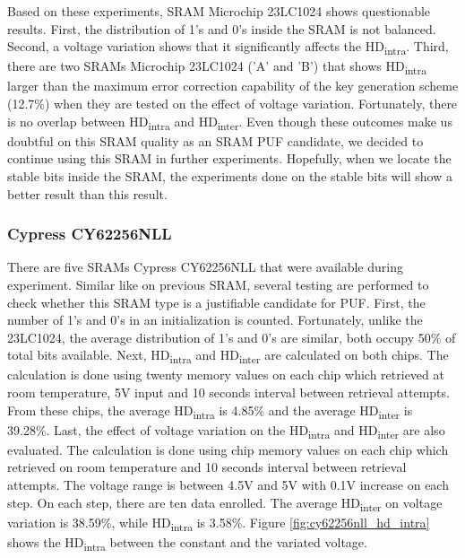 Based on these experiments, SRAM Microchip 23LC1024 shows questionable results. First, the distribution of 1's and 0's inside the SRAM is not balanced. Second, a voltage variation shows that it significantly affects the  HD\textsubscript{intra}. Third, there are two SRAMs Microchip 23LC1024 ('A' and 'B') that shows HD\textsubscript{intra} larger than the maximum error correction capability of the key generation scheme (12.7\%) when they are tested on the effect of voltage variation. Fortunately, there is no overlap between HD\textsubscript{intra} and HD\textsubscript{inter}. Even though these outcomes make us doubtful on this SRAM quality as an SRAM PUF candidate, we decided to continue using this SRAM in further experiments. Hopefully, when we locate the stable bits inside the SRAM, the experiments done on the stable bits will show a better result than this result.

\subsubsection{Cypress CY62256NLL}

There are five SRAMs Cypress CY62256NLL that were available during experiment. Similar like on previous SRAM, several testing are performed to check whether this SRAM type is a justifiable candidate for PUF.
First, the number of 1's and 0's in an initialization is counted. Fortunately, unlike the 23LC1024, the average distribution of 1's and 0's are similar, both occupy 50\% of total bits available.
Next,
HD\textsubscript{intra} and HD\textsubscript{inter} are calculated on both chips. The calculation is done using twenty memory values on each chip which retrieved at room temperature, 5V input and 10 seconds interval between retrieval attempts.
From these chips, the average HD\textsubscript{intra} is 4.85\% and the average HD\textsubscript{inter} is 39.28\%.
Last, the effect of voltage variation on the HD\textsubscript{intra} and HD\textsubscript{inter} are also evaluated. The calculation is done using chip memory values on each chip which retrieved on room temperature and 10 seconds interval between retrieval attempts. The voltage range is between 4.5V and 5V with 0.1V increase on each step. On each step, there are ten data enrolled.
The average HD\textsubscript{inter} on voltage variation is 38.59\%, while HD\textsubscript{intra} is 3.58\%. Figure \ref{fig:cy62256nll_hd_intra} shows the HD\textsubscript{intra} between the constant and the variated voltage.

